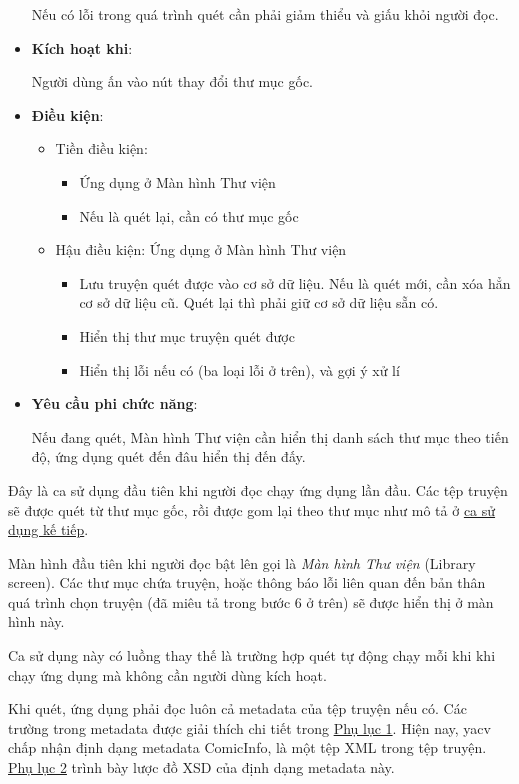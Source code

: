 \documentclass[
]{article}
\providecommand{\tightlist}{%
  \setlength{\itemsep}{0pt}\setlength{\parskip}{0pt}}
\begin{document}
\begin{itemize}
  Nếu có lỗi trong quá trình quét cần phải giảm thiểu và giấu khỏi người
  đọc.
\item
  \textbf{Kích hoạt khi}:

  Người dùng ấn vào nút thay đổi thư mục gốc.
\item
  \textbf{Điều kiện}:

  \begin{itemize}
  \item
    Tiền điều kiện:

    \begin{itemize}
    \tightlist
    \item
      Ứng dụng ở Màn hình Thư viện
    \item
      Nếu là quét lại, cần có thư mục gốc
    \end{itemize}
  \item
    Hậu điều kiện: Ứng dụng ở Màn hình Thư viện

    \begin{itemize}
    \tightlist
    \item
      Lưu truyện quét được vào cơ sở dữ liệu. Nếu là quét mới, cần xóa
      hẳn cơ sở dữ liệu cũ. Quét lại thì phải giữ cơ sở dữ liệu sẵn có.
    \item
      Hiển thị thư mục truyện quét được
    \item
      Hiển thị lỗi nếu có (ba loại lỗi ở trên), và gợi ý xử lí
    \end{itemize}
  \end{itemize}
\item
  \textbf{Yêu cầu phi chức năng}:

  Nếu đang quét, Màn hình Thư viện cần hiển thị danh sách thư mục theo
  tiến độ, ứng dụng quét đến đâu hiển thị đến đấy.
\end{itemize}

Đây là ca sử dụng đầu tiên khi người đọc chạy ứng dụng lần đầu. Các tệp
truyện sẽ được quét từ thư mục gốc, rồi được gom lại theo thư mục như mô
tả ở \protect\hyperlink{P3.3.2-browsing}{ca sử dụng kế tiếp}.

Màn hình đầu tiên khi người đọc bật lên gọi là \emph{Màn hình Thư viện}
(Library screen). Các thư mục chứa truyện, hoặc thông báo lỗi liên quan
đến bản thân quá trình chọn truyện (đã miêu tả trong bước 6 ở trên) sẽ
được hiển thị ở màn hình này.

Ca sử dụng này có luồng thay thế là trường hợp quét tự động chạy mỗi khi
khi chạy ứng dụng mà không cần người dùng kích hoạt.

Khi quét, ứng dụng phải đọc luôn cả metadata của tệp truyện nếu có. Các
trường trong metadata được giải thích chi tiết trong
\protect\hyperlink{P8.1-metadata}{Phụ lục 1}. Hiện nay, yacv chấp nhận
định dạng metadata ComicInfo, là một tệp XML trong tệp truyện.
\protect\hyperlink{P8.2-comicinfo.xsd}{Phụ lục 2} trình bày lược đồ XSD
của định dạng metadata này.
\end{document}
